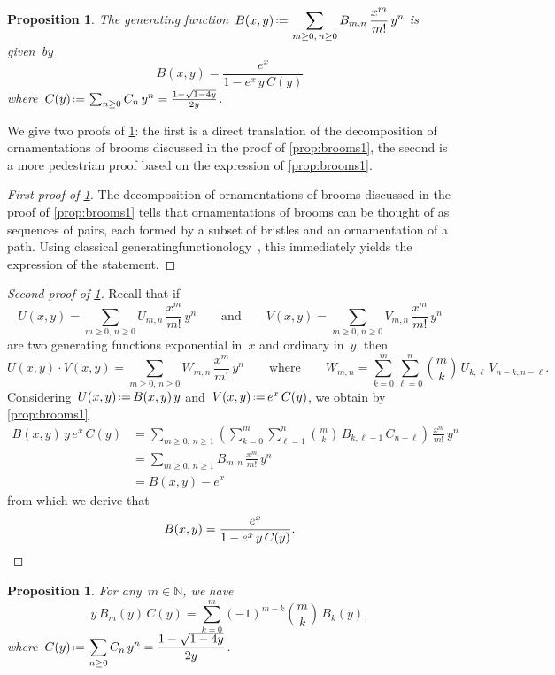 \documentclass{amsart}
\newtheorem{proposition}[theorem]{Proposition}
\theoremstyle{definition}
\newcommand{\N}{\mathbb{N}} %
\newcommand{\eqdef}{\mbox{\,\raisebox{0.2ex}{\scriptsize\ensuremath{\mathrm:}}\ensuremath{=}\,}} %
\begin{document}
\begin{proposition}
\label{prop:brooms2}
The generating function~$\displaystyle B(x,y) \eqdef \sum_{m \ge 0, \, n \ge 0} B_{m,n} \, \frac{x^m}{m!} \, y^n$ is given~by
\[
B(x,y) = \frac{e^x}{1-e^x \, y \, C(y)}
\]
where~$C(y) \eqdef \sum_{n \ge 0} C_n \, y^n = \frac{1-\sqrt{1-4y}}{2y}$.
\end{proposition}

We give two proofs of \cref{prop:brooms2}: the first is a direct translation of the decomposition of ornamentations of brooms discussed in the proof of \cref{prop:brooms1}, the second is a more pedestrian proof based on the expression of \cref{prop:brooms1}.

\begin{proof}[First proof of \cref{prop:brooms2}]
The decomposition of ornamentations of brooms discussed in the proof of \cref{prop:brooms1} tells that ornamentations of brooms can be thought of as sequences of pairs, each formed by a subset of bristles and an ornamentation of a path.
Using classical generatingfunctionology~\cite{FlajoletSedgewick}, this immediately yields the expression of the statement.
\end{proof}

\begin{proof}[Second proof of \cref{prop:brooms2}]
Recall that if
\[
U(x,y) = \sum_{m \ge 0, \, n \ge 0} U_{m,n} \, \frac{x^m}{m!} \, y^n
\qquad\text{and}\qquad
V(x,y) = \sum_{m \ge 0, \, n \ge 0} V_{m,n} \, \frac{x^m}{m!} \, y^n
\]
are two generating functions exponential in~$x$ and ordinary in~$y$, then
\[
U(x,y) \cdot V(x,y) = \sum_{m \ge 0, \, n \ge 0} W_{m,n}  \, \frac{x^m}{m!} \, y^n
\qquad\text{where}\qquad
W_{m,n} = \sum_{k = 0}^m \sum_{\ell = 0}^n \binom{m}{k} \, U_{k,\ell} \, V_{n-k,n-\ell}.
\]
Considering~$U(x,y) \eqdef B(x,y) \, y$ and~$V(x,y) \eqdef e^x \, C(y)$, we obtain by \cref{prop:brooms1}
\begin{align*}
B(x,y) \, y \, e^x \, C(y) & = \sum_{m \ge 0, \, n \ge 1}  \left( \sum_{k = 0}^m \sum_{\ell = 1}^n \binom{m}{k} \, B_{k,\ell-1} \, C_{n-\ell} \right) \, \frac{x^m}{m!} \, y^n \\
& = \sum_{m \ge 0, \, n \ge 1} B_{m,n} \, \frac{x^m}{m!} \, y^n \\
& = B(x,y) - e^x
\end{align*}
from which we derive that
\[
B(x,y) = \frac{e^x}{1-e^x \, y \, C(y)}.
\qedhere
\]
\end{proof}

\begin{proposition}
\label{prop:brooms3}
For any~$m \in \N$, we have
\[
y \, B_m(y) \, C(y) = \sum_{k = 0}^m (-1)^{m-k} \binom{m}{k} \, B_k(y),
\]
where~$\displaystyle C(y) \eqdef \sum_{n \ge 0} C_n \, y^n = \frac{1-\sqrt{1-4y}}{2y}$.
\end{proposition}
\end{document}
